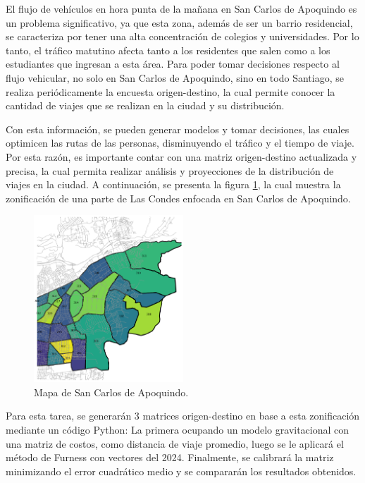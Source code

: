\documentclass[letterpaper,12pt]{article}
\begin{document}
El flujo de vehículos en hora punta de la mañana en San Carlos de Apoquindo es un problema significativo, ya que esta zona, además de ser un barrio residencial, se caracteriza por tener una alta concentración de colegios y universidades. Por lo tanto, el tráfico matutino afecta tanto a los residentes que salen como a los estudiantes que ingresan a esta área. Para poder tomar decisiones respecto al flujo vehicular, no solo en San Carlos de Apoquindo, sino en todo Santiago, se realiza periódicamente la encuesta origen-destino, la cual permite conocer la cantidad de viajes que se realizan en la ciudad y su distribución.

Con esta información, se pueden generar modelos y tomar decisiones, las cuales optimicen las rutas de las personas, disminuyendo el tráfico y el tiempo de viaje. Por esta razón, es importante contar con una matriz origen-destino actualizada y precisa, la cual permita realizar análisis y proyecciones de la distribución de viajes en la ciudad. A continuación, se presenta la figura \ref{fig:mapa}, la cual muestra la zonificación de una parte de Las Condes enfocada en San Carlos de Apoquindo. 

\begin{figure}[h!]
    \centering
    \includegraphics[width=0.5\textwidth]{fotos/mapa.png}
    \caption{Mapa de San Carlos de Apoquindo.}
    \label{fig:mapa}
\end{figure}

Para esta tarea, se generarán 3 matrices origen-destino en base a esta zonificación mediante un código Python: La primera ocupando un modelo gravitacional con una matriz de costos, como distancia de viaje promedio, luego se le aplicará el método de Furness con vectores del 2024. Finalmente, se calibrará la matriz minimizando el error cuadrático medio y se compararán los resultados obtenidos.
\end{document}
